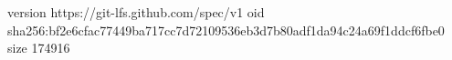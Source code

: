 version https://git-lfs.github.com/spec/v1
oid sha256:bf2e6cfac77449ba717cc7d72109536eb3d7b80adf1da94c24a69f1ddcf6fbe0
size 174916
